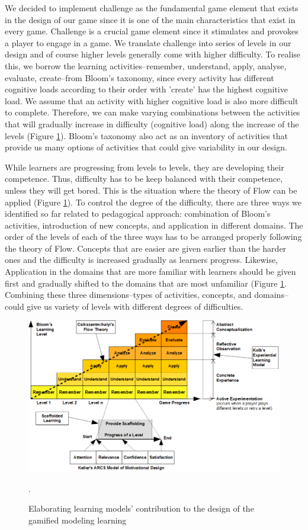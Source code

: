 \documentclass[12pt, a4paper]{report}
\begin{document}
We decided to implement challenge as the fundamental game element that exists in the design of our game since it is one of the main characteristics that exist in every game. Challenge is a crucial game element since it stimulates and provokes a player to engage in a game. We translate challenge into series of levels in our design and of course higher levels generally come with higher difficulty. To realise this, we borrow the learning activities--remember, understand, apply, analyse, evaluate, create--from Bloom's taxonomy, since every activity has different cognitive loads according to their order with 'create' has the highest cognitive load. We assume that an activity with higher cognitive load is also more difficult to complete. Therefore, we can make varying combinations between the activities that will gradually increase in difficulty (cognitive load) along the increase of the levels (Figure \ref{learning-models}). Bloom's taxonomy also act as an inventory of activities that provide us many options of activities that could give variability in our design. 

While learners are progressing from levels to levels, they are developing their competence. Thus, difficulty has to be keep balanced with their competence, unless they will get bored. This is the situation where the theory of Flow can be applied (Figure \ref{learning-models}). To control the degree of the difficulty, there are three ways we identified so far related to pedagogical approach: combination of Bloom's activities, introduction of new concepts, and application in different domains. The order of the levels of each of the three ways has to be arranged properly following the theory of Flow. Concepts that are easier are given earlier than the harder ones and the difficulty is increased gradually as learners progress. Likewise, Application in the domains that are more familiar with learners should be given first and gradually shifted to the domains that are most unfamiliar (Figure \ref{learning-models}. Combining these three dimensions--types of activities, concepts, and domains--could give us variety of levels with different degrees of difficulties.




\begin{figure}[ht]
\centering
\includegraphics[width=\textwidth]{learning-models}
\caption{Elaborating learning models' contribution to the design of the gamified modeling learning}.
\label{learning-models}
\end{figure}
\end{document}
